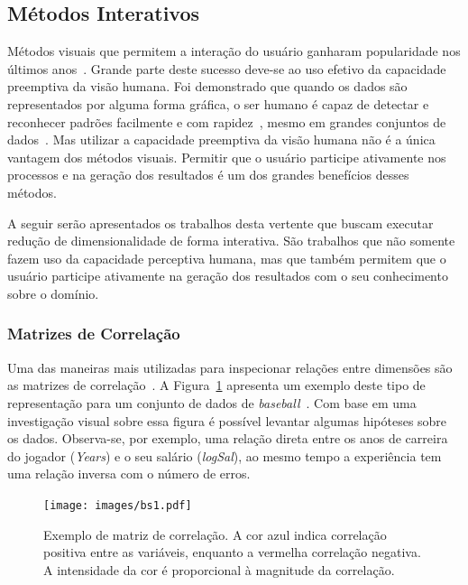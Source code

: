 \subsection{Métodos Interativos}\label{ss:int}

Métodos visuais que permitem a interação do usuário ganharam
popularidade nos últimos anos~\cite{State2012}.
Grande parte deste sucesso deve-se ao uso efetivo
da capacidade preemptiva da visão humana. Foi demonstrado
que quando os dados são representados por alguma forma
gráfica, o ser humano é capaz de detectar e reconhecer
padrões facilmente e com rapidez~\cite{Healey1995}, mesmo em
grandes conjuntos de dados~\cite{Fodor2002}. Mas utilizar a
capacidade preemptiva da visão humana não é a única vantagem
dos métodos visuais. Permitir que o usuário participe
ativamente nos processos e na geração dos resultados é um
dos grandes benefícios desses métodos. 

A seguir serão apresentados os trabalhos desta vertente que
buscam executar redução de dimensionalidade de forma
interativa. São trabalhos que não somente fazem uso da
capacidade perceptiva humana, mas que também permitem que o
usuário participe ativamente na geração dos resultados com o
seu conhecimento sobre o domínio.

\subsubsection{Matrizes de Correlação}\label{sss:cormat}

Uma das maneiras mais utilizadas para inspecionar
relações entre dimensões são as matrizes de
correlação~\cite{Friendly2002}. A Figura~\ref{fig:bs1}
apresenta um exemplo deste tipo de representação para um
conjunto de dados de \emph{baseball}~\cite{Friendly2002}. Com base em uma
investigação visual sobre essa figura é possível levantar
algumas hipóteses sobre os dados. Observa-se, por exemplo,
uma relação direta entre os anos de carreira do jogador
(\emph{Years}) e o seu salário (\emph{logSal}), ao mesmo tempo a
experiência tem uma relação inversa com o número de erros.

\begin{figure}[h!]
    \centering
    \texttt{[image: images/bs1.pdf]}
    \caption[Matrizes de Correlação]
    {Exemplo de matriz de correlação. A cor azul indica
    correlação positiva entre as variáveis, enquanto a
vermelha correlação negativa. A intensidade da cor é
proporcional à magnitude da correlação.}
    \label{fig:bs1}
\end{figure}

